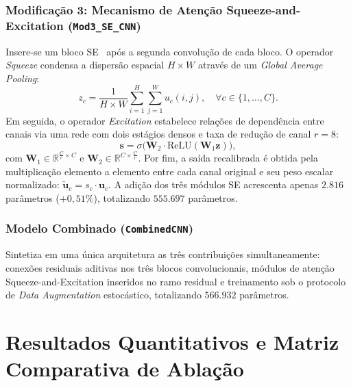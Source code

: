 \documentclass[runningheads]{llncs}
\begin{document}
\subsubsection{Modifica\c{c}\~{a}o 3: Mecanismo de Aten\c{c}\~{a}o Squeeze-and-Excitation (\texttt{Mod3\_SE\_CNN})}
Insere-se um bloco SE~\cite{hu2018squeeze} ap\'{o}s a segunda convolu\c{c}\~{a}o de cada bloco. O operador \textit{Squeeze} condensa a dispers\~{a}o espacial $H \times W$ atrav\'{e}s de um \textit{Global Average Pooling}:
\begin{equation}
    z_c = \frac{1}{H \times W} \sum_{i=1}^{H} \sum_{j=1}^{W} u_c(i, j), \quad \forall c \in \{1, \dots, C\}.
    \label{eq:se_squeeze}
\end{equation}
Em seguida, o operador \textit{Excitation} estabelece rela\c{c}\~{o}es de depend\^{e}ncia entre canais via uma rede com dois est\'{a}gios densos e taxa de redu\c{c}\~{a}o de canal $r = 8$:
\begin{equation}
    \mathbf{s} = \sigma\Big(\mathbf{W}_2 \cdot \text{ReLU}(\mathbf{W}_1 \mathbf{z})\Big),
    \label{eq:se_excitation}
\end{equation}
com $\mathbf{W}_1 \in \mathbb{R}^{\frac{C}{r} \times C}$ e $\mathbf{W}_2 \in \mathbb{R}^{C \times \frac{C}{r}}$. Por fim, a sa\'{i}da recalibrada \'{e} obtida pela multiplica\c{c}\~{a}o elemento a elemento entre cada canal original e seu peso escalar normalizado: $\tilde{\mathbf{u}}_c = s_c \cdot \mathbf{u}_c$. A adi\c{c}\~{a}o dos tr\^{e}s m\'{o}dulos SE acrescenta apenas $2.816$ par\^{a}metros ($+0{,}51\%$), totalizando $555.697$ par\^{a}metros.

\subsubsection{Modelo Combinado (\texttt{CombinedCNN})}
Sintetiza em uma \'{u}nica arquitetura as tr\^{e}s contribui\c{c}\~{o}es simultaneamente: conex\~{o}es residuais aditivas nos tr\^{e}s blocos convolucionais, m\'{o}dulos de aten\c{c}\~{a}o Squeeze-and-Excitation inseridos no ramo residual e treinamento sob o protocolo de \textit{Data Augmentation} estoc\'{a}stico, totalizando $566.932$ par\^{a}metros.

\section{Resultados Quantitativos e Matriz Comparativa de Abla\c{c}\~{a}o}
\label{sec:resultados}
\end{document}
